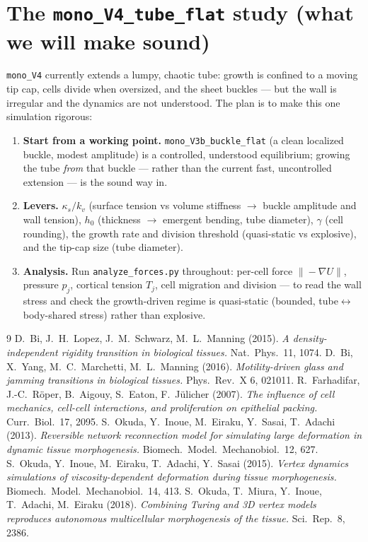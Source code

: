 \documentclass[11pt]{article}
\begin{document}
\section{The \texttt{mono\_V4\_tube\_flat} study (what we will make sound)}
\texttt{mono\_V4} currently extends a lumpy, chaotic tube: growth is confined to a moving tip cap, cells
divide when oversized, and the sheet buckles --- but the wall is irregular and the dynamics are not
understood. The plan is to make this one simulation rigorous:
\begin{enumerate}\itemsep2pt
\item \textbf{Start from a working point.} \texttt{mono\_V3b\_buckle\_flat} (a clean localized buckle, modest
amplitude) is a controlled, understood equilibrium; growing the tube \emph{from} that buckle --- rather than
the current fast, uncontrolled extension --- is the sound way in.
\item \textbf{Levers.} $\kappa_s/k_v$ (surface tension vs volume stiffness $\to$ buckle amplitude and wall
tension), $h_0$ (thickness $\to$ emergent bending, tube diameter), $\gamma$ (cell rounding), the growth rate
and division threshold (quasi-static vs explosive), and the tip-cap size (tube diameter).
\item \textbf{Analysis.} Run \texttt{analyze\_forces.py} throughout: per-cell force $\|-\nabla U\|$, pressure
$p_j$, cortical tension $T_j$, cell migration and division --- to read the wall stress and check the
growth-driven regime is quasi-static (bounded, tube$\leftrightarrow$body-shared stress) rather than
explosive.
\end{enumerate}

\begin{thebibliography}{9}
 D.~Bi, J.~H.~Lopez, J.~M.~Schwarz, M.~L.~Manning (2015). \emph{A density-independent
rigidity transition in biological tissues.} Nat.\ Phys.\ 11, 1074.
 D.~Bi, X.~Yang, M.~C.~Marchetti, M.~L.~Manning (2016). \emph{Motility-driven glass and
jamming transitions in biological tissues.} Phys.\ Rev.\ X 6, 021011.
 R.~Farhadifar, J.-C.~R\"oper, B.~Aigouy, S.~Eaton, F.~J\"ulicher (2007). \emph{The
influence of cell mechanics, cell-cell interactions, and proliferation on epithelial packing.} Curr.\ Biol.\
17, 2095.
 S.~Okuda, Y.~Inoue, M.~Eiraku, Y.~Sasai, T.~Adachi (2013). \emph{Reversible network
reconnection model for simulating large deformation in dynamic tissue morphogenesis.} Biomech.\ Model.\
Mechanobiol.\ 12, 627.
\bibitem{okuda2015} S.~Okuda, Y.~Inoue, M.~Eiraku, T.~Adachi, Y.~Sasai (2015). \emph{Vertex dynamics
simulations of viscosity-dependent deformation during tissue morphogenesis.} Biomech.\ Model.\ Mechanobiol.\
14, 413.
\bibitem{okuda2018} S.~Okuda, T.~Miura, Y.~Inoue, T.~Adachi, M.~Eiraku (2018). \emph{Combining Turing and 3D
vertex models reproduces autonomous multicellular morphogenesis of the tissue.} Sci.\ Rep.\ 8, 2386.
\end{thebibliography}
\end{document}
